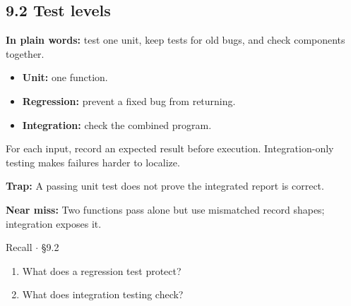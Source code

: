 \documentclass[11pt]{article}
\begin{document}
\begin{keepsection}
\section{9.2 Test levels}

\begin{plainbox}\textbf{In plain words:} test one unit, keep tests for old bugs, and check components together.\end{plainbox}

\begin{itemize}
\item \textbf{Unit:} one function.
\item \textbf{Regression:} prevent a fixed bug from returning.
\item \textbf{Integration:} check the combined program.
\end{itemize}

For each input, record an expected result before execution. Integration-only testing makes failures harder to localize.

\begin{notebox}\textbf{Trap:} A passing unit test does not prove the integrated report is correct.\end{notebox}

\begin{notebox}\textbf{Near miss:} Two functions pass alone but use mismatched record shapes; integration exposes it.\end{notebox}

\begin{recallbox}{Recall \ensuremath{\cdot} §9.2}
\begin{enumerate}
\item What does a regression test protect?
\item What does integration testing check?
\end{enumerate}

\end{recallbox}
\end{keepsection}
\end{document}
